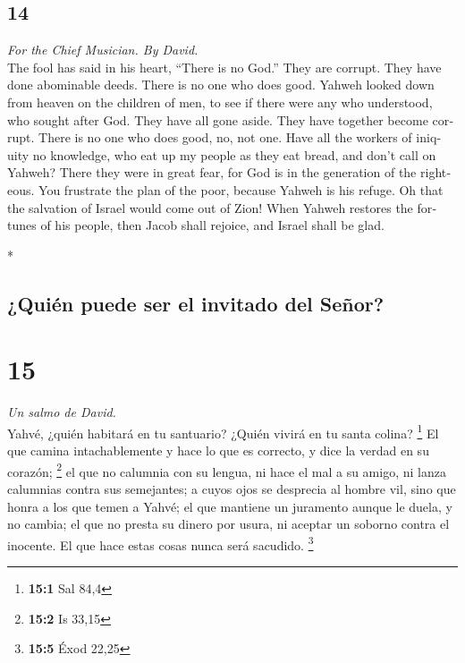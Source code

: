 \begin{paracol}{2}
\switchcolumn
\begin{otherlanguage}{english}

\hypertarget{section-27}{%
\section{14}\label{section-27}}

\emph{For the Chief Musician. By David.}\\
 The fool has said in his heart, ``There is no God.'' They
are corrupt. They have done abominable deeds. There is no one who does
good.  Yahweh looked down from heaven on the children of
men, to see if there were any who understood, who sought after God.
 They have all gone aside. They have together become
corrupt. There is no one who does good, no, not one.  Have
all the workers of iniquity no knowledge, who eat up my people as they
eat bread, and don't call on Yahweh?  There they were in
great fear, for God is in the generation of the righteous.
 You frustrate the plan of the poor, because Yahweh is his
refuge.  Oh that the salvation of Israel would come out of
Zion! When Yahweh restores the fortunes of his people, then Jacob shall
rejoice, and Israel shall be glad.

\end{otherlanguage}

\switchcolumn[0]*

\hypertarget{quiuxe9n-puede-ser-el-invitado-del-seuxf1or}{%
\subsection{¿Quién puede ser el invitado del
Señor?}\label{quiuxe9n-puede-ser-el-invitado-del-seuxf1or}}

\hypertarget{section-28}{%
\section{15}\label{section-28}}

\emph{Un salmo de David.}\\
 Yahvé, ¿quién habitará en tu santuario? ¿Quién vivirá en
tu santa colina? \footnote{\textbf{15:1} Sal 84,4}  El que
camina intachablemente y hace lo que es correcto, y dice la verdad en su
corazón; \footnote{\textbf{15:2} Is 33,15}  el que no
calumnia con su lengua, ni hace el mal a su amigo, ni lanza calumnias
contra sus semejantes;  a cuyos ojos se desprecia al
hombre vil, sino que honra a los que temen a Yahvé; el que mantiene un
juramento aunque le duela, y no cambia;  el que no presta
su dinero por usura, ni aceptar un soborno contra el inocente. El que
hace estas cosas nunca será sacudido. \footnote{\textbf{15:5} Éxod 22,25}


\end{paracol}
